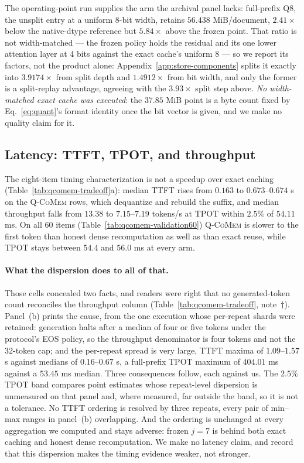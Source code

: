 \documentclass{article}
\newcommand{\qcomem}{\textsc{Q-CoMem}}
\begin{document}
The operating-point run supplies the arm the archival panel lacks: full-prefix
Q8, the unsplit entry at a uniform 8-bit width, retains $56.438$ MiB/document,
$2.41\times$ below the native-dtype reference but $5.84\times$ above the
frozen point.  That ratio is not width-matched --- the frozen policy holds the
residual and its one lower attention layer at 4 bits against the exact cache's
uniform 8 --- so we report its factors, not the product alone:
Appendix~\ref{app:store-components} splits it exactly into $3.9174\times$ from
split depth and $1.4912\times$ from bit width, and only the former is a
split-replay advantage, agreeing with the $3.93\times$ split step above.
\emph{No width-matched exact cache was executed}: the $37.85$ MiB point is a
byte count fixed by Eq.~\ref{eq:quant}'s format identity once the bit vector is
given, and we make no quality claim for it.



\subsection{Latency: TTFT, TPOT, and throughput}
\label{sec:latency}

The eight-item timing characterization is not a speedup over exact caching
(Table~\ref{tab:qcomem-tradeoff}a): median TTFT rises from $0.163$ to
$0.673$--$0.674$ s on the \qcomem{} rows, which dequantize and rebuild the
suffix, and median throughput falls from $13.38$ to $7.15$--$7.19$ tokens/s at
TPOT within $2.5\%$ of $54.11$ ms.  On all 60 items
(Table~\ref{tab:qcomem-validation60}) \qcomem{} is slower to the first token than
honest dense recomputation as well as than exact reuse, while TPOT stays between
$54.4$ and $56.0$ ms at every arm.

\paragraph{What the dispersion does to all of that.}
Those cells concealed two facts, and readers were right that no generated-token
count reconciles the throughput column (Table~\ref{tab:qcomem-tradeoff},
note~$\dagger$).  Panel~(b) prints the cause,
from the one execution whose per-repeat shards were retained: generation halts
after a median of four or five tokens under the protocol's EOS policy, so the
throughput denominator is four tokens and not the 32-token cap; and the
per-repeat spread is very large, TTFT maxima of $1.09$--$1.57$ s against medians
of $0.16$--$0.67$ s, a full-prefix TPOT maximum of $404.01$ ms against a $53.45$
ms median.  Three consequences follow, each against us.  The $2.5\%$ TPOT band compares
point estimates whose repeat-level dispersion is unmeasured on that panel and,
where measured, far outside the band, so it is not a tolerance.  No TTFT ordering
is resolved by three repeats, every pair of min--max ranges in panel~(b)
overlapping.  And the ordering is unchanged at every aggregation we computed and
stays adverse: frozen $j=7$ is behind both exact caching and honest dense
recomputation.  We make no latency claim, and record that this dispersion makes
the timing evidence weaker, not stronger.
\end{document}
